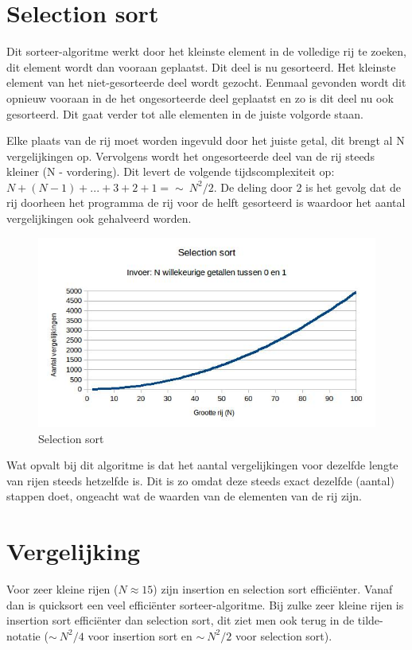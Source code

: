 \documentclass{article}
\begin{document}
\raggedright

\newpage
\section{Selection sort}
Dit sorteer-algoritme werkt door het kleinste element in de volledige rij te zoeken, dit element wordt dan vooraan geplaatst. Dit deel is nu gesorteerd. Het kleinste element van het niet-gesorteerde deel wordt gezocht. Eenmaal gevonden wordt dit opnieuw vooraan in de het ongesorteerde deel geplaatst en zo is dit deel nu ook gesorteerd. Dit gaat verder tot alle elementen in de juiste volgorde staan.

Elke plaats van de rij moet worden ingevuld door het juiste getal, dit brengt al N vergelijkingen op. Vervolgens wordt het ongesorteerde deel van de rij steeds kleiner (N - vordering). Dit levert de volgende tijdscomplexiteit op: $  N + (N-1) + ... + 3 + 2 + 1 = \sim\ N^2/2 $. De deling door 2 is het gevolg dat de rij doorheen het programma de rij voor de helft gesorteerd is waardoor het aantal vergelijkingen ook gehalveerd worden.

\begin{figure}[h!]
\centering
\includegraphics[scale=0.55]{selection_1-100.jpg}
\caption{Selection sort}
\label{fig:Selectiont_1-100}
\end{figure}

Wat opvalt bij dit algoritme is dat het aantal vergelijkingen voor dezelfde lengte van rijen steeds hetzelfde is. Dit is zo omdat deze steeds exact dezelfde (aantal) stappen doet, ongeacht wat de waarden van de elementen van de rij zijn.

\newpage
\section{Vergelijking}
Voor zeer kleine rijen ($N \approx 15$) zijn insertion en selection sort efficiënter. Vanaf dan is quicksort een veel efficiënter sorteer-algoritme. Bij zulke zeer kleine rijen is insertion sort efficiënter dan selection sort, dit ziet men ook terug in de tilde-notatie ($ \sim\ N^2/4 $ voor insertion sort en $ \sim\ N^2/2 $ voor selection sort).
\end{document}
